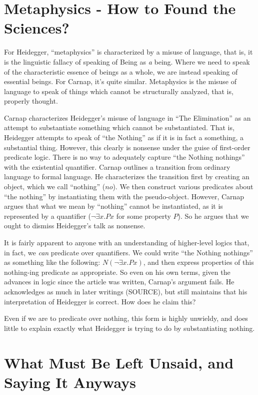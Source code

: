\documentclass[leqno, 12pt]{turabian-researchpaper}
\begin{document}
	\section{Metaphysics - How to Found the Sciences?}

	For Heidegger, \enquote{metaphysics} is characterized by a misuse of language,
	that is, it is the linguistic fallacy of speaking of Being as \emph{a} being.
	Where we need to speak of the characteristic essence of beings as a whole, we are
	instead speaking of essential beings. For Carnap, it's quite similar.
	Metaphysics is the misuse of language to speak of things which cannot be
	structurally analyzed, that is, properly thought.

	Carnap characterizes Heidegger's misuse of language in \enquote{The Elimination}
	as an attempt to substantiate something which cannot be substantiated. That is,
	Heidegger attempts to speak of \enquote{the Nothing} as if it is in fact a
	something, a substantial thing. However, this clearly is nonsense under the guise
	of first-order predicate logic. There is no way to adequately capture \enquote{the Nothing nothings}
	with the existential quantifier. Carnap outlines a transition from ordinary
	language to formal language. He characterizes the transition first by creating
	an object, which we call \enquote{nothing} ($no$). We then construct various
	predicates about \enquote{the nothing} by instantiating them with the pseudo-object.
	However, Carnap argues that what we mean by \enquote{nothing} cannot be
	instantiated, as it is represented by a quantifier ($\neg\exists x.Px$ for
	some property $P$). So he argues that we ought to dismiss Heidegger's talk as
	nonsense.

	It is fairly apparent to anyone with an understanding of higher-level logics
	that, in fact, we \emph{can} predicate over quantifiers. We could write
	\enquote{the Nothing nothings} as something like the following:
	$N(\neg\exists x . Px)$, and then express properties of this nothing-ing predicate
	as appropriate. So even on his own terms, given the advances in logic since the
	article was written, Carnap's argument fails. He acknowledges as much in later
	writings (SOURCE), but still maintains that his interpretation of Heidegger is
	correct. How does he claim this?

	Even if we are to predicate over nothing, this form is highly unwieldy, and does
	little to explain exactly what Heidegger is trying to do by substantiating nothing.

	\section{What Must Be Left Unsaid, and Saying It Anyways}
\end{document}
